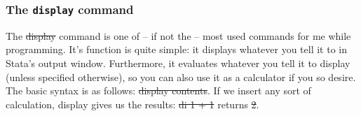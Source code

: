 \subsubsection{The \texttt{display} command}
The \st{display} command is one of -- if not the -- most used commands for me while programming.
It's function is quite simple: it displays whatever you tell it to in Stata's output window.
Furthermore, it evaluates whatever you tell it to display (unless specified otherwise),
so you can also use it as a calculator if you so desire.
The basic syntax is as follows: \st{display contents}.
If we insert any sort of calculation, display gives us the results:
\st{di 1 + 1} returns \st{2}.

